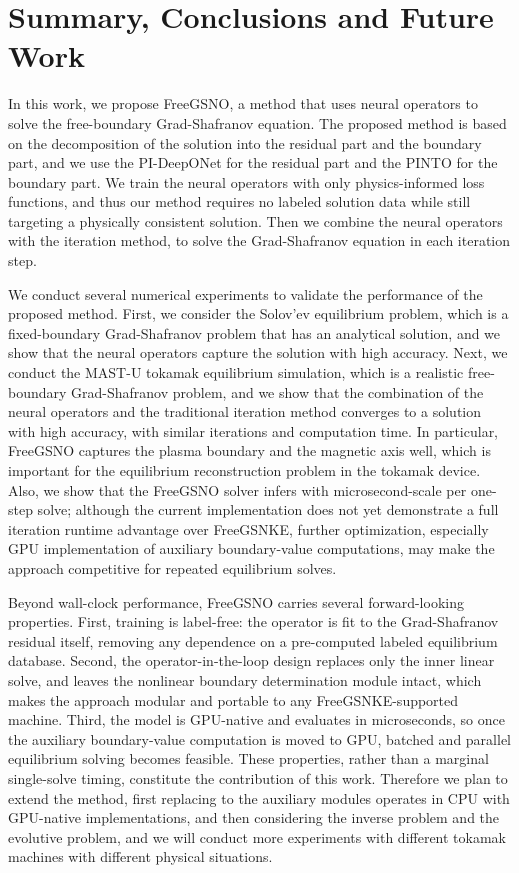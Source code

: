 \section{Summary, Conclusions and Future Work} \label{sec:6}
In this work, we propose FreeGSNO, a method that uses neural operators 
to solve the free-boundary Grad-Shafranov equation.
The proposed method is based on the decomposition of the solution into the residual part and the boundary part, and we use the PI-DeepONet for the residual part and the PINTO for the boundary part.
We train the neural operators with only physics-informed loss functions,
and thus our method requires no labeled solution data while still targeting a physically consistent solution.
Then we combine the neural operators with the iteration method, 
to solve the Grad-Shafranov equation in each iteration step.

We conduct several numerical experiments to validate the performance of the proposed method.
First, we consider the Solov'ev equilibrium problem, which is a fixed-boundary 
Grad-Shafranov problem that has an analytical solution, 
and we show that the neural operators capture the solution with high accuracy.
Next, we conduct the MAST-U tokamak equilibrium simulation, which is a realistic free-boundary 
Grad-Shafranov problem, and we show that the combination of the neural operators and the
traditional iteration method converges to a solution with high accuracy,
with similar iterations and computation time.
In particular, FreeGSNO captures the plasma boundary and the magnetic axis well,
which is important for the equilibrium reconstruction problem in the tokamak device.
Also, we show that the FreeGSNO solver infers with microsecond-scale per one-step solve;
although the current implementation does not yet demonstrate a full iteration 
runtime advantage over FreeGSNKE,
further optimization, especially GPU implementation of auxiliary boundary-value computations, 
may make the approach competitive for repeated equilibrium solves.

Beyond wall-clock performance, FreeGSNO carries several forward-looking properties. 
First, training is label-free: the operator is fit to the Grad-Shafranov residual itself, 
removing any dependence on a pre-computed labeled equilibrium database. 
Second, the operator-in-the-loop design replaces only the inner linear solve, 
and leaves the nonlinear boundary determination module intact, 
which makes the approach modular and portable to any FreeGSNKE-supported machine. 
Third, the model is GPU-native and evaluates in microseconds, 
so once the auxiliary boundary-value computation is moved to GPU, 
batched and parallel equilibrium solving becomes feasible. 
These properties, rather than a marginal single-solve timing, 
constitute the contribution of this work.
Therefore we plan to extend the method, first replacing to the auxiliary modules
operates in CPU with GPU-native implementations, 
and then considering the inverse problem and the evolutive problem, 
and we will conduct more experiments with different tokamak machines with 
different physical situations.

